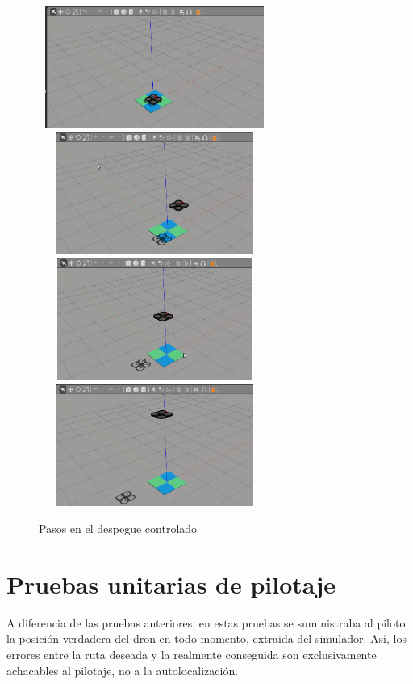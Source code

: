 \begin{figure}[H]
 \centering
    \includegraphics[width=7.6cm,height=4cm]{imag/IMG99.png}
    \includegraphics[width=7.6cm,height=4cm]{imag/IMG98.png}
    \includegraphics[width=7.6cm,height=4cm]{imag/IMG97.png}
    \includegraphics[width=7.6cm,height=4cm]{imag/IMG96.png}
 \caption{Pasos en el despegue controlado}
 \label{f:Despegue controlado}
\end{figure}

\section{Pruebas unitarias de pilotaje}
\hspace{1cm} A diferencia de las pruebas anteriores, en estas pruebas se suministraba al piloto la posición verdadera del dron en todo momento, extraida del simulador. Así, los errores entre la ruta deseada y la realmente conseguida son exclusivamente achacables al pilotaje, no a la autolocalización. 

